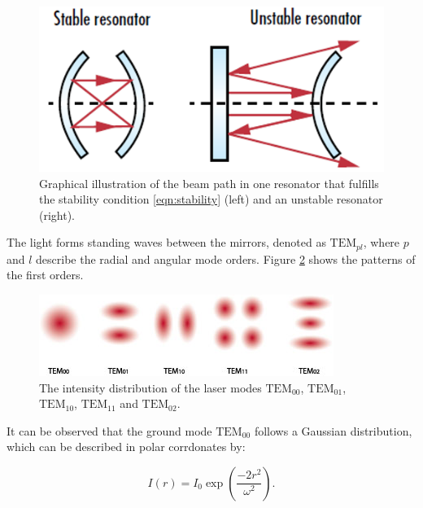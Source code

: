 \begin{figure}[H]
    \centering
    \includegraphics[scale=0.5]{pictures/resonator.png} %
    \caption{Graphical illustration of the beam path in one resonator that fulfills the stability condition \eqref{eqn:stability} (left) and an unstable resonator (right). \cite{resonator}}
    \label{fig:resonator}
\end{figure}

The light forms standing waves between the mirrors, denoted as $\text{TEM}_{pl}$,
where $p$ and $l$ describe the radial and angular mode orders. Figure 
\ref{fig:TEM} shows the patterns of the first orders.

\begin{figure}[H]
    \centering
    \includegraphics[scale=0.8]{pictures/modes2.jpg} %
    \caption{The intensity distribution of the laser modes $\text{TEM}_{00}$, $\text{TEM}_{01}$, $\text{TEM}_{10}$, $\text{TEM}_{11}$ and $\text{TEM}_{02}$. \cite{TEM2}}
    \label{fig:TEM}
\end{figure}

It can be observed that the ground mode $\text{TEM}_{00}$ follows a 
Gaussian distribution, which can be described in polar corrdonates by:

\begin{equation}
    I(r)=I_0 \exp{\left(\frac{-2r^2}{\omega^2}\right)}.
\end{equation}
